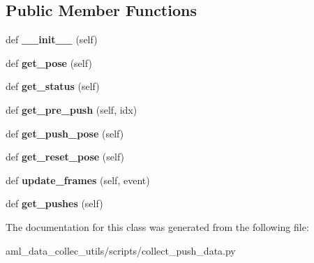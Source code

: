 \subsection*{Public Member Functions}
\begin{DoxyCompactItemize}
\item 
\hypertarget{classscripts_1_1collect__push__data_1_1_box_object_ad68ce2001ed164296e78e7dc82f64d0c}{}\label{classscripts_1_1collect__push__data_1_1_box_object_ad68ce2001ed164296e78e7dc82f64d0c} 
def {\bfseries \+\_\+\+\_\+init\+\_\+\+\_\+} (self)
\item 
\hypertarget{classscripts_1_1collect__push__data_1_1_box_object_adbdf92548b76002c379f5b60bb9595b2}{}\label{classscripts_1_1collect__push__data_1_1_box_object_adbdf92548b76002c379f5b60bb9595b2} 
def {\bfseries get\+\_\+pose} (self)
\item 
\hypertarget{classscripts_1_1collect__push__data_1_1_box_object_a8805e17b45fc416036ed7ee43cc30820}{}\label{classscripts_1_1collect__push__data_1_1_box_object_a8805e17b45fc416036ed7ee43cc30820} 
def {\bfseries get\+\_\+status} (self)
\item 
\hypertarget{classscripts_1_1collect__push__data_1_1_box_object_a9b9c05857b70c0625004f21fcc3257fe}{}\label{classscripts_1_1collect__push__data_1_1_box_object_a9b9c05857b70c0625004f21fcc3257fe} 
def {\bfseries get\+\_\+pre\+\_\+push} (self, idx)
\item 
\hypertarget{classscripts_1_1collect__push__data_1_1_box_object_aef4c40b8c89122ed6572ad767a7b9b31}{}\label{classscripts_1_1collect__push__data_1_1_box_object_aef4c40b8c89122ed6572ad767a7b9b31} 
def {\bfseries get\+\_\+push\+\_\+pose} (self)
\item 
\hypertarget{classscripts_1_1collect__push__data_1_1_box_object_a585974b669fefb8fa2b096303238d920}{}\label{classscripts_1_1collect__push__data_1_1_box_object_a585974b669fefb8fa2b096303238d920} 
def {\bfseries get\+\_\+reset\+\_\+pose} (self)
\item 
\hypertarget{classscripts_1_1collect__push__data_1_1_box_object_a44880e249d6ba7435251c990e812f953}{}\label{classscripts_1_1collect__push__data_1_1_box_object_a44880e249d6ba7435251c990e812f953} 
def {\bfseries update\+\_\+frames} (self, event)
\item 
\hypertarget{classscripts_1_1collect__push__data_1_1_box_object_ad766b16187bc3fb74d748493d83640e7}{}\label{classscripts_1_1collect__push__data_1_1_box_object_ad766b16187bc3fb74d748493d83640e7} 
def {\bfseries get\+\_\+pushes} (self)
\end{DoxyCompactItemize}


The documentation for this class was generated from the following file\+:\begin{DoxyCompactItemize}
\item 
aml\+\_\+data\+\_\+collec\+\_\+utils/scripts/collect\+\_\+push\+\_\+data.\+py\end{DoxyCompactItemize}
